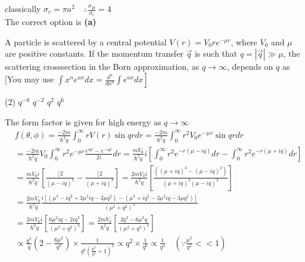 \begin{enumerate}
\begin{answer}
	classically $\sigma_{c}=\pi a^{2} \quad \therefore \frac{\sigma_{H}}{\sigma_{c}}=4$\\
	The correct option is \textbf{(a)}
\end{answer}
\begin{minipage}{\textwidth}
	\item A particle is scattered by a central potential $V(r)=V_{0} r e^{-\mu r}$, where $V_{0}$ and $\mu$ are positive constants. If the momentum transfer $\vec{q}$ is such that $q=|\vec{q}| \gg \mu$, the scattering crosssection in the Born approximation, as $q \rightarrow \infty$, depends on $q$ as
	[You may use $\left.\int x^{n} e^{a x} d x=\frac{d^{n}}{d a^{n}} \int e^{a x} d x\right]$
\end{minipage}
\begin{tasks}(2)
	\task[\textbf{A.}]$q^{-8}$
	\task[\textbf{B.}]$q^{-2}$
	\task[\textbf{C.}]$q^{2}$
	\task[\textbf{D.}]$q^{6}$
\end{tasks}
\begin{answer}
 The form factor is given for high energy as $q \rightarrow \infty$ \\
 \begin{align*}
 &f(\theta, \phi)=\frac{-2 m}{\hbar^{2} q} \int_{0}^{\infty} r V(r) \sin q r d r=\frac{-2 m}{\hbar^{2} q} \int_{0}^{\infty} r^{2} V_{0} e^{-\mu v} \sin q r d r\\
 	&=\frac{-2 m}{\hbar^{2} q} V_{0} \int_{0}^{\infty} r^{2} e^{-\mu r} \frac{e^{i q r}-e^{-i q r}}{2 i} d r=\frac{m V_{0}}{\hbar^{2} q} i\left[\int_{0}^{\infty} r^{2} e^{-r(\mu-i q)} d r-\int_{0}^{\infty} r^{2} e^{-r(\mu+i q)} d r\right] \\
 	&=\frac{m V_{0} i}{\hbar^{2} q}\left[\frac{\lfloor 2}{(\mu-i q)^{3}}-\frac{\lfloor 2}{(\mu+i q)^{3}}\right]=\frac{2 m V_{0} i}{\hbar^{2} q}\left[\frac{\left((\mu+i q)^{3}-(\mu-i q)^{3}\right)}{(\mu+i q)^{3}(\mu-i q)^{3}}\right] \\
 	&=\frac{2 m V_{0}}{\hbar^{2} q} \frac{i\left[\left(\mu^{3}-i q^{3}+3 \mu^{2} i q-3 \mu q^{2}\right)-\left(\mu^{3}+i q^{3}-3 \mu^{2} i q-3 \mu q^{2}\right)\right]}{\left(\mu^{2}+q^{2}\right)^{3}}\\
 	&=\frac{2 m V_{0} i}{\hbar^{2} q}\left[\frac{6 \mu^{2} i q-2 i q^{3}}{\left(\mu^{2}+q^{2}\right)^{3}}\right]=\frac{2 m V_{0}}{\hbar^{2} q}\left[\frac{2 q^{3}-6 \mu^{2} q}{\left(\mu^{2}+q^{2}\right)^{3}}\right] \\
 	&\propto \frac{q^{3}}{q}\left(2-\frac{6 \mu^{2}}{q^{2}}\right) \times \frac{1}{q^{6}\left(\frac{\mu^{2}}{q^{2}}+1\right)^{3}} \propto q^{2} \times \frac{1}{q^{6}} \propto \frac{1}{q^{4}} \quad\left(\because \frac{\mu^{2}}{q^{2}}<<1\right) \\

\end{align*}
\end{answer}
\end{enumerate}
